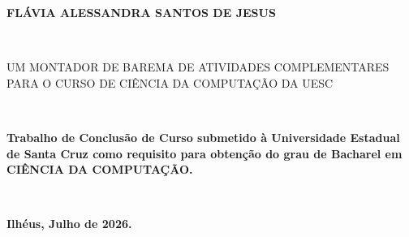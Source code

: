 
%
% 
%
\begin{folhadeaprovacao}


\begin{center}

    {\large \begin{large} \bfseries FLÁVIA ALESSANDRA SANTOS DE JESUS\end{large}\\}
    \vspace{4cm}
    {\large\bfseries{\begin{large}UM MONTADOR DE BAREMA DE ATIVIDADES COMPLEMENTARES PARA O CURSO DE
    CIÊNCIA DA COMPUTAÇÃO DA UESC
 \end{large}}\\}
    \vspace{1cm}
    \hspace{.45\linewidth}
    \begin{minipage}{.50\linewidth}

            \textbf{Trabalho de Conclusão de Curso submetido à Universidade Estadual de Santa Cruz  como requisito 
            para obtenção do grau de Bacharel em CIÊNCIA DA COMPUTAÇÃO. }
    \end{minipage}
    \\
\end{center}
    \textbf{Ilhéus, Julho de 2026.}
\begin{center}
           

    \bfseries{}
\end{center}



\end{folhadeaprovacao}
